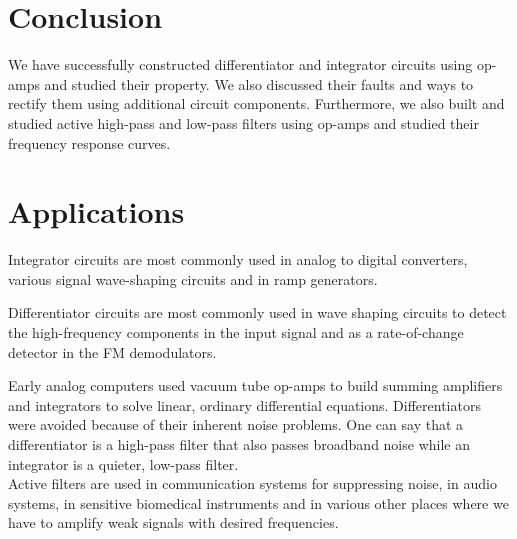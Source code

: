 \section{Conclusion}

We have successfully constructed differentiator and integrator circuits using op-amps and studied their property. We also discussed their faults and ways to rectify them using additional circuit components.
Furthermore, we also built and studied active high-pass and low-pass filters using op-amps and studied their frequency response curves.

\section{Applications}

Integrator circuits are most commonly used in analog to digital converters, various signal wave-shaping circuits and in ramp generators.

Differentiator circuits are most commonly used in wave shaping circuits to detect the high-frequency components in the input signal and as a rate-of-change detector in the FM demodulators.

Early analog computers used vacuum tube op-amps to build summing
amplifiers and integrators to solve linear, ordinary differential equations. Differentiators were avoided because of their inherent noise problems. One can say that a differentiator is a high-pass filter that also passes broadband noise while an integrator is a quieter, low-pass filter.\\

Active filters are used in communication systems for suppressing noise, in audio systems, in sensitive biomedical instruments and in various other places where we have to amplify weak signals with desired frequencies. 